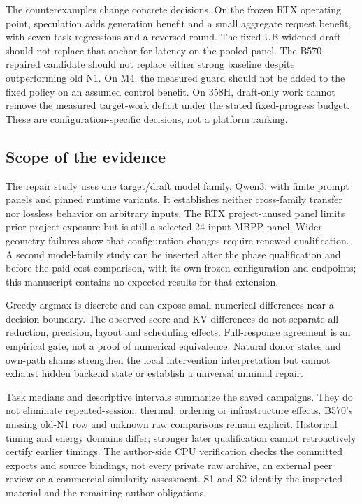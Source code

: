 The counterexamples change concrete decisions. On the frozen RTX operating point, speculation adds generation benefit and a small aggregate request benefit, with seven task regressions and a reversed round. The fixed-UB widened draft should not replace that anchor for latency on the pooled panel. The B570 repaired candidate should not replace either strong baseline despite outperforming old N1. On M4, the measured guard should not be added to the fixed policy on an assumed control benefit. On 358H, draft-only work cannot remove the measured target-work deficit under the stated fixed-progress budget. These are configuration-specific decisions, not a platform ranking.

\subsection{Scope of the evidence}
The repair study uses one target/draft model family, Qwen3, with finite prompt panels and pinned runtime variants. It establishes neither cross-family transfer nor lossless behavior on arbitrary inputs. The RTX project-unused panel limits prior project exposure but is still a selected 24-input MBPP panel. Wider geometry failures show that configuration changes require renewed qualification. A second model-family study can be inserted after the phase qualification and before the paid-cost comparison, with its own frozen configuration and endpoints; this manuscript contains no expected results for that extension.

Greedy argmax is discrete and can expose small numerical differences near a decision boundary. The observed score and KV differences do not separate all reduction, precision, layout and scheduling effects. Full-response agreement is an empirical gate, not a proof of numerical equivalence. Natural donor states and own-path shams strengthen the local intervention interpretation but cannot exhaust hidden backend state or establish a universal minimal repair.

Task medians and descriptive intervals summarize the saved campaigns. They do not eliminate repeated-session, thermal, ordering or infrastructure effects. B570's missing old-N1 row and unknown raw comparisons remain explicit. Historical timing and energy domains differ; stronger later qualification cannot retroactively certify earlier timings. The author-side CPU verification checks the committed exports and source bindings, not every private raw archive, an external peer review or a commercial similarity assessment. S1 and S2 identify the inspected material and the remaining author obligations.
